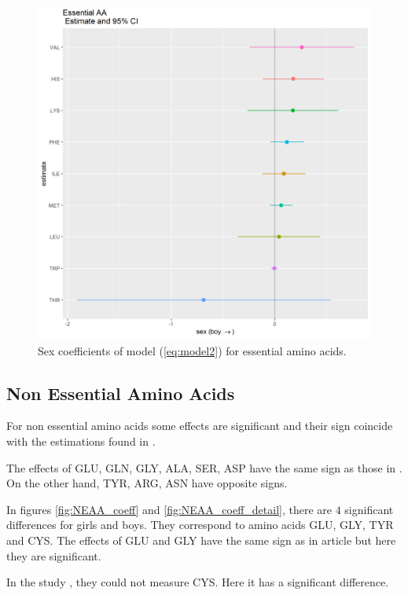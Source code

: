 \documentclass[12pt]{article}
\begin{document}
\begin{figure}[!htb]
  \includegraphics[width= \textwidth]{../sex/EAA_coeff.png}
  \caption{Sex coefficients of model (\ref{eq:model2}) for essential amino acids.}
  \label{fig:EAA_coeff}
\end{figure}


\subsection{Non Essential Amino Acids}

For non essential amino acids some effects are significant and their sign coincide with the estimations found in \cite{NutrientsDutch}.

The effects of GLU, GLN, GLY, ALA, SER, ASP have the same sign as those in \cite{NutrientsDutch}. On the other hand, TYR, ARG, ASN have opposite signs.

In figures \ref{fig:NEAA_coeff} and \ref{fig:NEAA_coeff_detail}, there are $4$ significant differences for girls and boys. They correspond to amino acids GLU, GLY, TYR and CYS. The effects of GLU and GLY have the same sign as in article \cite{NutrientsDutch} but here they are significant.

In the study \cite{NutrientsDutch}, they could not measure CYS. Here it has a significant difference.
\end{document}
